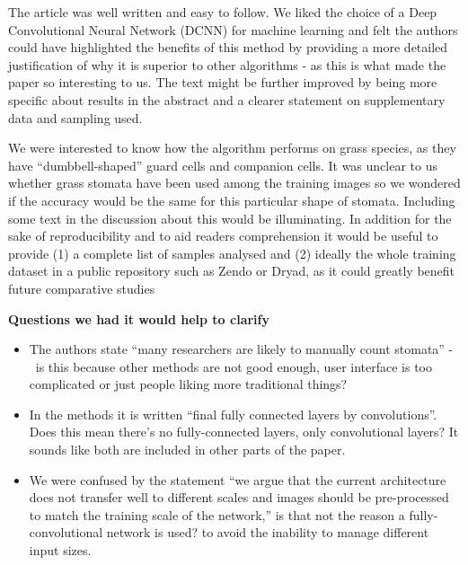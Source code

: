 \documentclass[10pt]{article}
\providecommand{\tightlist}{\setlength{\itemsep}{0pt}\setlength{\parskip}{0pt}}%
\begin{document}
\par\null

The article was well written and easy to follow. We liked the choice of
a Deep Convolutional Neural Network (DCNN) for machine learning and felt
the authors could have highlighted the benefits of this method by
providing a more detailed justification of why it is superior to other
algorithms - as this is what made the paper so interesting to us. The
text might be further improved by being more specific about results in
the abstract and a clearer statement on supplementary data and sampling
used.

\par\null

We were interested to know how the algorithm performs on grass species,
as they have ``dumbbell-shaped'' guard cells and companion cells. It was
unclear to us whether grass stomata have been used among the training
images so we wondered if the accuracy would be the same for this
particular shape of stomata. Including some text in the discussion about
this would be illuminating. In addition for the sake of reproducibility
and to aid readers comprehension it would be useful to provide (1) a
complete list of samples analysed and (2) ideally the whole training
dataset in a public repository such as Zendo or Dryad, as it could
greatly benefit future comparative studies

\par\null

\textbf{Questions we had it would help to clarify}

\begin{itemize}
\tightlist
\item
  The authors state ``many researchers are likely to manually count
  stomata'' - ~is this because other methods are not good enough, user
  interface is too complicated or just people liking more traditional
  things?
\item
  In the methods it is written ``final fully connected layers by
  convolutions''. Does this mean there's no fully-connected layers, only
  convolutional layers? It sounds like both are included in other parts
  of the paper.
\item
  We were confused by the statement ``we argue that the current
  architecture does not transfer well to different scales and images
  should be pre-processed to match the training scale of the network,''
  is that not the reason a fully-convolutional network is used? to avoid
  the inability to manage different input sizes.
\end{itemize}
\end{document}

